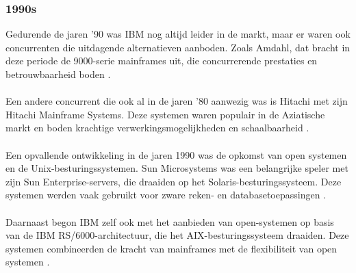 \subsubsection{1990s}
Gedurende de jaren ’90 was IBM nog altijd leider in de markt, maar er waren ook concurrenten die uitdagende alternatieven aanboden. Zoals Amdahl, dat bracht in deze periode de 9000-serie mainframes uit, die concurrerende prestaties en betrouwbaarheid boden \autocite{Ceruzzi2003}.
\\ \\
Een andere concurrent die ook al in de jaren '80 aanwezig was is Hitachi met zijn Hitachi Mainframe Systems. Deze systemen waren populair in de Aziatische markt en boden krachtige verwerkingsmogelijkheden en schaalbaarheid \autocite{Ceruzzi2003}.
\\ \\
Een opvallende ontwikkeling in de jaren 1990 was de opkomst van open systemen en de Unix-besturingssystemen. Sun Microsystems was een belangrijke speler met zijn Sun Enterprise-servers, die draaiden op het Solaris-besturingssysteem. Deze systemen werden vaak gebruikt voor zware reken- en databasetoepassingen \autocite{Ceruzzi2003}.
\\ \\
Daarnaast begon IBM zelf ook met het aanbieden van open-systemen op basis van de IBM RS/6000-architectuur, die het AIX-besturingssysteem draaiden. Deze systemen combineerden de kracht van mainframes met de flexibiliteit van open systemen \autocite{Ceruzzi2003}.
\\ \\
